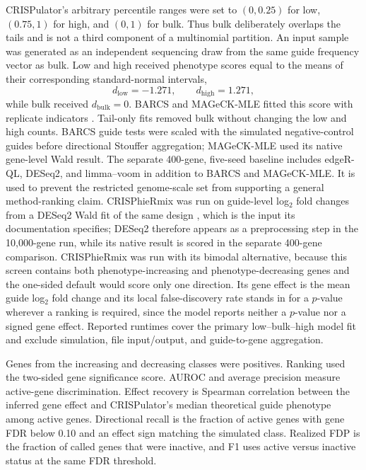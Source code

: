 CRISPulator's arbitrary percentile ranges were set to $(0,0.25)$ for low,
$(0.75,1)$ for high, and $(0,1)$ for bulk.  Thus bulk deliberately overlaps
the tails and is not a third component of a multinomial partition.  An input
sample was generated as an independent sequencing draw from the same guide
frequency vector as bulk.  Low and high received phenotype scores equal to
the means of their corresponding standard-normal intervals,
\[
 d_{\mathrm{low}}=-1.271,\qquad
 d_{\mathrm{high}}=1.271,
\]
while bulk received $d_{\mathrm{bulk}}=0$.  BARCS and MAGeCK-MLE fitted this
score with replicate indicators \citep{li2015mageckvispr}.
Tail-only fits removed bulk without changing the low and high counts.  BARCS
guide tests were scaled with the simulated negative-control guides before
directional Stouffer aggregation; MAGeCK-MLE used its native gene-level Wald
result.  The separate 400-gene, five-seed baseline includes edgeR-QL, DESeq2,
and limma--voom in addition to BARCS and MAGeCK-MLE.  It is used to prevent the
restricted genome-scale set from supporting a general method-ranking claim.
CRISPhieRmix \citep{daley2018crisphiermix} was run on guide-level log$_2$
fold changes from a DESeq2 Wald fit of the same design
\citep{love2014deseq2}, which is the input its documentation specifies;
DESeq2 therefore appears as a preprocessing step in the 10,000-gene run, while
its native result is scored in the separate 400-gene comparison.
CRISPhieRmix was run with its bimodal alternative, because this screen
contains both phenotype-increasing and phenotype-decreasing genes and the
one-sided default would score only one direction.  Its gene effect is the
mean guide log$_2$ fold change and its local false-discovery rate stands in
for a $p$-value wherever a ranking is required, since the model reports
neither a $p$-value nor a signed gene effect.  Reported runtimes cover the
primary low--bulk--high model fit and exclude simulation, file input/output,
and guide-to-gene aggregation.

Genes from the increasing and decreasing classes were positives.  Ranking
used the two-sided gene significance score.  AUROC and average precision
measure active-gene discrimination.  Effect recovery is Spearman correlation
between the inferred gene effect and CRISPulator's median theoretical guide
phenotype among active genes.  Directional recall is the fraction of active
genes with gene FDR below 0.10 and an effect sign matching the simulated
class.  Realized FDP is the fraction of called genes that were inactive, and
F1 uses active versus inactive status at the same FDR threshold.
